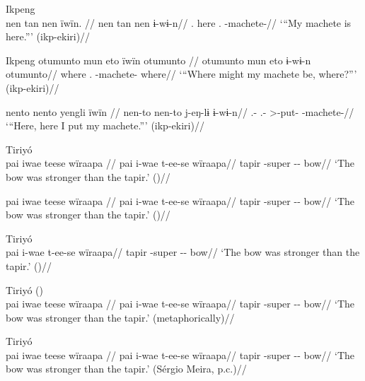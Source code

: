 \documentclass{article}
\begin{document}
\ex  Ikpeng  \\\label{ekiri-13}
\begingl \glpreamble nen tan nen ïwïn. //
\gla nen tan nen ɨ-wɨ-n//
\glb {}. here . -machete-//
\glft ‘“My machete is here.”’ (ikp-ekiri)//
\endgl
\xe

\pex Ikpeng\label{machete}    
\a \label{ekiri-9}
\begingl \glpreamble otumunto mun eto ïwïn otumunto //
\gla otumunto mun eto ɨ-wɨ-n otumunto//
\glb where .  -machete- where//
\glft ‘“Where might my machete be, where?”’ (ikp-ekiri)//
\endgl

    
\a \label{ekiri-10}
\begingl \glpreamble nento nento yengli ïwïn //
\gla nen-to nen-to j-eŋ-lɨ ɨ-wɨ-n//
\glb {}.- .- >-put- -machete-//
\glft ‘“Here, here I put my machete.”’ (ikp-ekiri)//
\endgl

\xe

\ex  Tiriyó  \\\label{tri-1}
\begingl \glpreamble pai iwae teese wïraapa //
\gla pai i-wae t-ee-se wïraapa//
\glb tapir -super -- bow//
\glft ‘The bow was stronger than the tapir.’ (\cite[420]{triomeira1999})//
\endgl
\xe

\ex \label{tri-1}
\begingl \glpreamble pai iwae teese wïraapa //
\gla pai i-wae t-ee-se wïraapa//
\glb tapir -super -- bow//
\glft ‘The bow was stronger than the tapir.’ (\cite[420]{triomeira1999})//
\endgl
\xe

\ex  Tiriyó  \\\label{tri-1}
\begingl 
\gla pai i-wae t-ee-se wïraapa//
\glb tapir -super -- bow//
\glft ‘The bow was stronger than the tapir.’ (\cite[420]{triomeira1999})//
\endgl
\xe

\ex  Tiriyó (\cite[420]{triomeira1999}) \\\label{tri-1}
\begingl \glpreamble pai iwae teese wïraapa //
\gla pai i-wae t-ee-se wïraapa//
\glb tapir -super -- bow//
\glft ‘The bow was stronger than the tapir.’ (metaphorically)//
\endgl
\xe

\ex  Tiriyó  \\\label{tri-1}
\begingl \glpreamble pai iwae teese wïraapa //
\gla pai i-wae t-ee-se wïraapa//
\glb tapir -super -- bow//
\glft ‘The bow was stronger than the tapir.’ (Sérgio Meira, p.c.)//
\endgl
\xe
\end{document}
